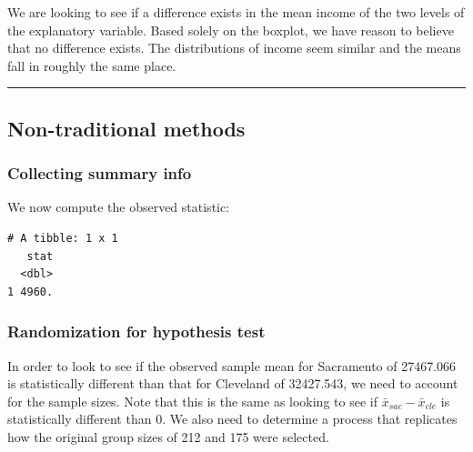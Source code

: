 \documentclass[12pt,]{krantz}
\makeatletter
\newenvironment{Shaded}{\begin{snugshade}}{\end{snugshade}}
\newcommand{\KeywordTok}[1]{\textcolor[rgb]{0.27,0.27,0.27}{\textbf{#1}}}
\newcommand{\DataTypeTok}[1]{\textcolor[rgb]{0.27,0.27,0.27}{#1}}
\newcommand{\StringTok}[1]{\textcolor[rgb]{0.5,0.5,0.5}{#1}}
\newcommand{\OperatorTok}[1]{\textcolor[rgb]{0.43,0.43,0.43}{\textbf{#1}}}
\newcommand{\NormalTok}[1]{#1}
\newenvironment{kframe}{%
\medskip{}
\setlength{\fboxsep}{.8em}
 \def\at@end@of@kframe{}%
 \ifinner\ifhmode%
  \def\at@end@of@kframe{\end{minipage}}%
  \begin{minipage}{\columnwidth}%
 \fi\fi%
 \def\FrameCommand##1{\hskip\@totalleftmargin \hskip-\fboxsep
 \colorbox{shadecolor}{##1}\hskip-\fboxsep
     \hskip-\linewidth \hskip-\@totalleftmargin \hskip\columnwidth}%
 \MakeFramed {\advance\hsize-\width
   \@totalleftmargin\z@ \linewidth\hsize
   \@setminipage}}%
 {\par\unskip\endMakeFramed%
 \at@end@of@kframe}
\renewenvironment{Shaded}{\begin{kframe}}{\end{kframe}}
\makeatother
\begin{document}
We are looking to see if a difference exists in the mean income of the
two levels of the explanatory variable. Based solely on the boxplot, we
have reason to believe that no difference exists. The distributions of
income seem similar and the means fall in roughly the same place.

\begin{center}\rule{0.5\linewidth}{\linethickness}\end{center}

\subsection{Non-traditional methods}\label{non-traditional-methods-3}

\subsubsection*{Collecting summary
info}\label{collecting-summary-info-1}


We now compute the observed statistic:

\begin{Shaded}
\end{Shaded}

\begin{verbatim}
# A tibble: 1 x 1
   stat
  <dbl>
1 4960.
\end{verbatim}

\subsubsection*{Randomization for hypothesis
test}\label{randomization-for-hypothesis-test-1}


In order to look to see if the observed sample mean for Sacramento of
27467.066 is statistically different than that for Cleveland of
32427.543, we need to account for the sample sizes. Note that this is
the same as looking to see if \(\bar{x}_{sac} - \bar{x}_{cle}\) is
statistically different than 0. We also need to determine a process that
replicates how the original group sizes of 212 and 175 were selected.
\end{document}
